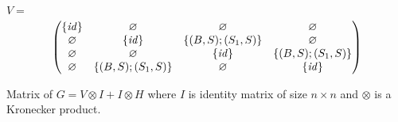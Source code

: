 \documentclass[12pt]{article}  %
\theoremstyle{definition}
\theoremstyle{remark}
\begin{document}
$V=$
\begin{align*}
\begin{pmatrix}
      \{ \text{\emph{id}} \}       & \varnothing       & \varnothing       & \varnothing  \\ 
      \varnothing       & \{ \text{\emph{id}} \}       & \{(B,S);(S_1,S)\} & \varnothing  \\
      \varnothing       & \varnothing       & \{ \text{\emph{id}} \}       & \{(B,S);(S_1,S)\}  \\
      \varnothing       & \{(B,S);(S_1,S)\} & \varnothing       & \{ \text{\emph{id}} \}  \\
\end{pmatrix}
\end{align*}


Matrix of $G = V \otimes I + I \otimes H$ where $I$ is identity matrix of size $n \times n$ and $\otimes$ is a Kronecker product.
\end{document}
